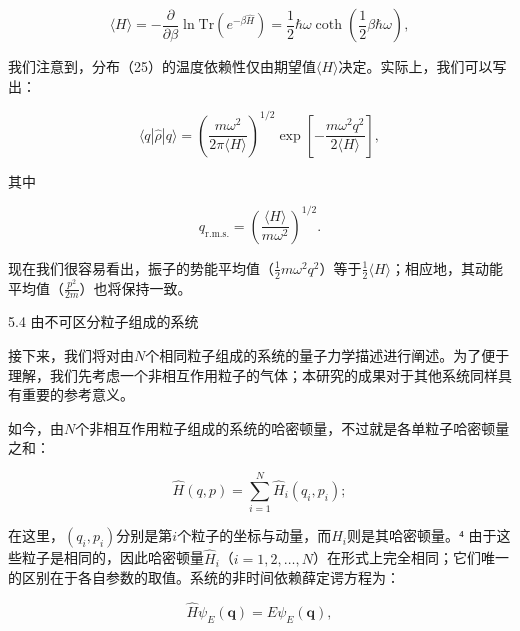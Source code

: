 \begin{equation}\tag{5.3.29}\label{eq:5.3.29}
\langle H \rangle = - \frac { \partial } { \partial \beta } \ln \mathrm { T r } \left( e ^{- \beta \hat { H} } \right) = \frac { 1 } { 2 } \hbar \omega \coth \left( \frac { 1 } { 2 } \beta \hbar \omega \right) ,
\end{equation}

我们注意到，分布（25）的温度依赖性仅由期望值\(\langle H\rangle\)决定。实际上，我们可以写出：

\begin{equation}\tag{5.3.30}\label{eq:5.3.30}
\langle q | \hat { \rho } | q \rangle = \left( \frac { m \omega ^{2} } { 2 \pi \langle H \rangle } \right) ^{1 / 2} \exp \left[ - \frac { m \omega ^{2} q ^{2} } { 2 \langle H \rangle } \right] ,
\end{equation}

其中

\begin{equation}\tag{5.3.31}\label{eq:5.3.31}
q _ { \mathrm { r . m . s . } } = \left( \frac { \langle H \rangle } { m \omega ^{2} } \right) ^{1 / 2} .
\end{equation}

现在我们很容易看出，振子的势能平均值（\(\frac{1}{2}m\omega^2q^2\)）等于\(\frac{1}{2}\langle H\rangle\)；相应地，其动能平均值（\(\frac{p^2}{2m}\)）也将保持一致。

5.4 由不可区分粒子组成的系统

接下来，我们将对由\(N\)个相同粒子组成的系统的量子力学描述进行阐述。为了便于理解，我们先考虑一个非相互作用粒子的气体；本研究的成果对于其他系统同样具有重要的参考意义。

如今，由\(N\)个非相互作用粒子组成的系统的哈密顿量，不过就是各单粒子哈密顿量之和：

\begin{equation}\tag{5.4.1}\label{eq:5.4.1}
\hat { H } ( q , p ) = \sum _ { i = 1 } ^{N} \hat { H } _ { i } ( q _ { i } , p _ { i } ) ;
\end{equation}

在这里，\((q_{i},p_{i})\)分别是第\(i\)个粒子的坐标与动量，而\(\hat{H}_{i}\)则是其哈密顿量。⁴ 由于这些粒子是相同的，因此哈密顿量\(\hat{H}_{i}\)（\(i=1,2,\ldots,N\)）在形式上完全相同；它们唯一的区别在于各自参数的取值。系统的非时间依赖薛定谔方程为：

\begin{equation}\tag{5.4.2}\label{eq:5.4.2}
\hat { H } \psi _ { E } ( \pmb { q } ) = E \psi _ { E } ( \pmb { q } ) ,
\end{equation}

